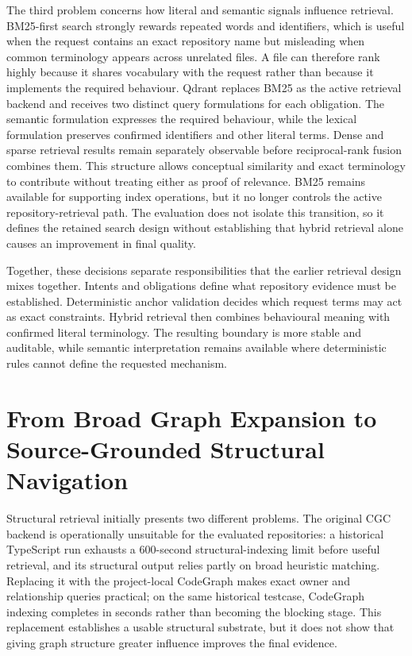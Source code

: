 The third problem concerns how literal and semantic signals influence retrieval. BM25-first search strongly rewards repeated words and identifiers, which is useful when the request contains an exact repository name but misleading when common terminology appears across unrelated files. A file can therefore rank highly because it shares vocabulary with the request rather than because it implements the required behaviour. Qdrant replaces BM25 as the active retrieval backend and receives two distinct query formulations for each obligation. The semantic formulation expresses the required behaviour, while the lexical formulation preserves confirmed identifiers and other literal terms. Dense and sparse retrieval results remain separately observable before reciprocal-rank fusion combines them. This structure allows conceptual similarity and exact terminology to contribute without treating either as proof of relevance. BM25 remains available for supporting index operations, but it no longer controls the active repository-retrieval path. The evaluation does not isolate this transition, so it defines the retained search design without establishing that hybrid retrieval alone causes an improvement in final quality.

Together, these decisions separate responsibilities that the earlier retrieval design mixes together. Intents and obligations define what repository evidence must be established. Deterministic anchor validation decides which request terms may act as exact constraints. Hybrid retrieval then combines behavioural meaning with confirmed literal terminology. The resulting boundary is more stable and auditable, while semantic interpretation remains available where deterministic rules cannot define the requested mechanism.

\section{From Broad Graph Expansion to Source-Grounded Structural Navigation}\label{sec:from-broad-graph-expansion-to-source-grounded-structural-navigation}

Structural retrieval initially presents two different problems. The original CGC backend is operationally unsuitable for the evaluated repositories: a historical TypeScript run exhausts a 600-second structural-indexing limit before useful retrieval, and its structural output relies partly on broad heuristic matching. Replacing it with the project-local CodeGraph makes exact owner and relationship queries practical; on the same historical testcase, CodeGraph indexing completes in seconds rather than becoming the blocking stage. This replacement establishes a usable structural substrate, but it does not show that giving graph structure greater influence improves the final evidence.

